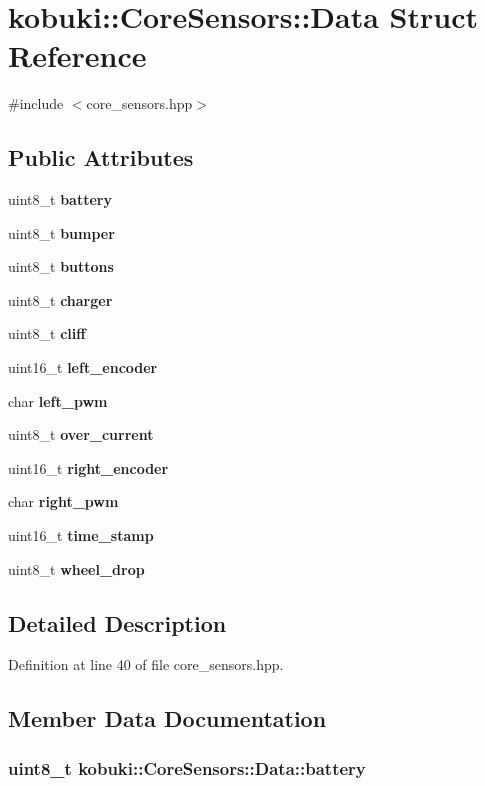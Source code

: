 \section{kobuki\-:\-:\-Core\-Sensors\-:\-:\-Data \-Struct \-Reference}
\label{structkobuki_1_1CoreSensors_1_1Data}


{\ttfamily \#include $<$core\-\_\-sensors.\-hpp$>$}

\subsection*{\-Public \-Attributes}
\begin{DoxyCompactItemize}
\item 
uint8\-\_\-t {\bf battery}
\item 
uint8\-\_\-t {\bf bumper}
\item 
uint8\-\_\-t {\bf buttons}
\item 
uint8\-\_\-t {\bf charger}
\item 
uint8\-\_\-t {\bf cliff}
\item 
uint16\-\_\-t {\bf left\-\_\-encoder}
\item 
char {\bf left\-\_\-pwm}
\item 
uint8\-\_\-t {\bf over\-\_\-current}
\item 
uint16\-\_\-t {\bf right\-\_\-encoder}
\item 
char {\bf right\-\_\-pwm}
\item 
uint16\-\_\-t {\bf time\-\_\-stamp}
\item 
uint8\-\_\-t {\bf wheel\-\_\-drop}
\end{DoxyCompactItemize}


\subsection{\-Detailed \-Description}


\-Definition at line 40 of file core\-\_\-sensors.\-hpp.



\subsection{\-Member \-Data \-Documentation}
\subsubsection[{battery}]{\setlength{\rightskip}{0pt plus 5cm}uint8\-\_\-t {\bf kobuki\-::\-Core\-Sensors\-::\-Data\-::battery}}\label{structkobuki_1_1CoreSensors_1_1Data_a6e2d199ac9856efb0da581cac93b9efe}


